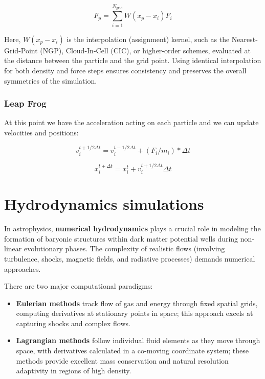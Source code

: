 $$
F_p = \sum_{i=1}^{N_\text{grid}} W(x_p - x_i) F_i
$$

Here, $W(x_p - x_i)$ is the interpolation (assignment) kernel, such as the Nearest-Grid-Point (NGP), Cloud-In-Cell (CIC), or higher-order schemes, evaluated at the distance between the particle and the grid point. Using identical interpolation for both density and force steps ensures consistency and preserves the overall symmetries of the simulation.

\subsubsection{Leap Frog}

At this point we have the acceleration acting on each particle and we can update velocities and positions:

$$
v_i^{t+1/2 \Delta t} = v_i^{t-1/2 \Delta t} + (F_i/m_i) * \Delta t
$$

$$
x_i^{t+ \Delta t} = x_i^{t} +  v_i^{t+1/2 \Delta t} \Delta t
$$


\newpage
\section{Hydrodynamics simulations}

In astrophysics, \textbf{numerical hydrodynamics} plays a crucial role in modeling the formation of baryonic structures within dark matter potential wells during non-linear evolutionary phases. The complexity of realistic flows (involving turbulence, shocks, magnetic fields, and radiative processes) demands numerical approaches. 

\medskip

There are two major computational paradigms: 

\begin{itemize}
    \item \textbf{Eulerian methods} track flow of gas and energy through fixed spatial grids, computing derivatives at stationary points in space; this approach excels at capturing shocks and complex flows. 
    \item \textbf{Lagrangian methods} follow individual fluid elements as they move through space, with derivatives calculated in a co-moving coordinate system; these methods provide excellent mass conservation and natural resolution adaptivity in regions of high density.
\end{itemize}

